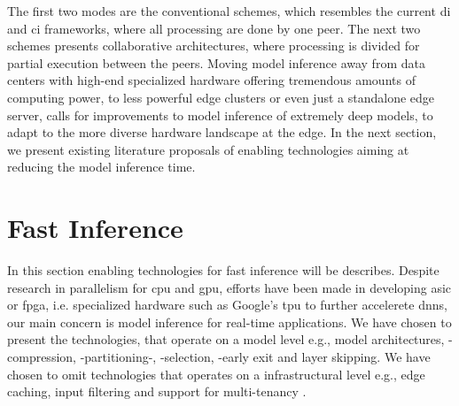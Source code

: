 The first two modes are the conventional schemes, which resembles the current \gls{di} and \gls{ci} frameworks, where all processing are done by one peer. The next two schemes presents collaborative architectures, where processing is divided for partial execution between the peers.
Moving model inference away from data centers with high-end specialized hardware offering tremendous amounts of computing power, to less powerful edge clusters or even just a standalone edge server, calls for improvements to model inference of extremely deep models, to adapt to the more diverse hardware landscape at the edge. In the next section, we present existing literature proposals of enabling technologies aiming at reducing the model inference time.

\section{Fast Inference} \label{sec:ei-fast-inference}

In this section enabling technologies for fast inference will be describes. Despite research in parallelism for \gls{cpu} and \gls{gpu}, efforts have been made in developing \gls{asic} or \gls{fpga}, i.e. specialized hardware such as Google's \gls{tpu} to further accelerete \gls{dnn}s, our main concern is model inference for real-time applications. We have chosen to present the technologies, that operate on a model level e.g., model architectures, -compression, -partitioning-, -selection, -early exit and layer skipping. We have chosen to omit technologies that operates on a infrastructural level e.g., edge caching, input filtering and support for multi-tenancy \cite{zhou_edge_2019}.

